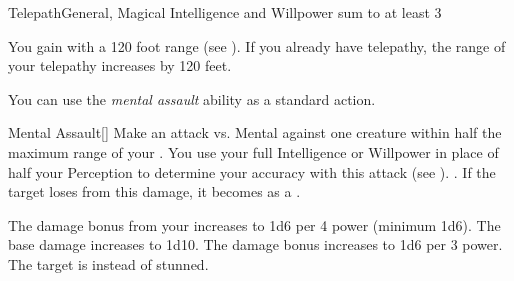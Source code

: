     \begin{magicalfeat}{Telepath}{General, Magical}
        \featpre Intelligence and Willpower sum to at least 3

         You gain  with a 120 foot range (see ).
        If you already have telepathy, the range of your telepathy increases by 120 feet.

         You can use the \textit{mental assault} ability as a standard action.
        \begin{magicalactiveability}{Mental Assault}[]
            \rankline
            Make an attack vs. Mental against one creature within half the maximum range of your .
            You use your full Intelligence or Willpower in place of half your Perception to determine your accuracy with this attack (see ).
            \hit {}.
            If the target loses  from this damage, it becomes \stunned as a .

            \rankline
             The damage bonus from your  increases to 1d6 per 4 power (minimum 1d6).
             The base damage increases to 1d10.
             The damage bonus increases to 1d6 per 3 power.
             The target is \confused instead of stunned.
        \end{magicalactiveability}


\end{magicalfeat}
